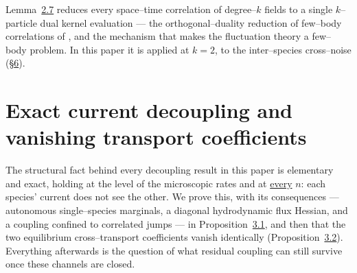 \documentclass[11pt]{article}
\theoremstyle{plain}
\theoremstyle{definition}
\theoremstyle{remark}
\begin{document}
\noindent Lemma~\hyperref[lem_acr]{2.7} reduces every space--time correlation of degree--$k$
fields to a single $k$--particle dual kernel evaluation --- the orthogonal--duality
reduction of few--body correlations of \cite{ACR,ACR2}, and the mechanism that makes the
fluctuation theory a few--body problem. In this paper it is applied at $k=2$, to the
inter--species cross--noise (\S\hyperref[sec_ew]{6}).

\section{Exact current decoupling and vanishing transport coefficients}\label{sec_decouple}

The structural fact behind every decoupling result in this paper is elementary and
exact, holding at the level of the microscopic rates and at \underline{every} $n$: each
species' current does not see the other. We prove this, with its consequences ---
autonomous single--species marginals, a diagonal hydrodynamic flux Hessian, and a
coupling confined to correlated jumps --- in Proposition~\hyperref[prop_decouple]{3.1}, and then
that the two equilibrium cross--transport coefficients vanish identically
(Proposition~\hyperref[prop_cross]{3.2}). Everything afterwards is the question of what residual
coupling can still survive once these channels are closed.
\end{document}
